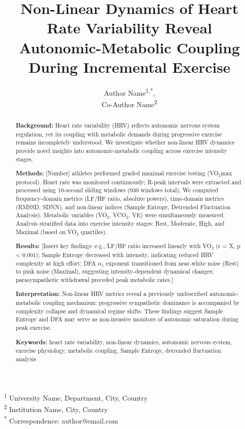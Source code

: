 \documentclass[12pt,a4paper]{article}
\title{\Large \textbf{Non-Linear Dynamics of Heart Rate Variability Reveal Autonomic-Metabolic Coupling During Incremental Exercise}}
\author{
    Author Name\textsuperscript{1,*}, \\
    Co-Author Name\textsuperscript{2}
}
\date{}
\makeatletter
\newcommand{\affiliation}{
    \small
    \textsuperscript{1} University Name, Department, City, Country \\
    \textsuperscript{2} Institution Name, City, Country \\
    \textsuperscript{*} Correspondence: author@email.com
}
\makeatother
\begin{document}
\maketitle

\affiliation

\vspace{1cm}


\begin{abstract}

\noindent
\textbf{Background:} Heart rate variability (HRV) reflects autonomic nervous system regulation, yet its coupling with metabolic demands during progressive exercise remains incompletely understood. We investigate whether non-linear HRV dynamics provide novel insights into autonomic-metabolic coupling across exercise intensity stages.

\noindent
\textbf{Methods:} [Number] athletes performed graded maximal exercise testing (VO$_2$max protocol). Heart rate was monitored continuously; R-peak intervals were extracted and processed using 10-second sliding windows (930 windows total). We computed frequency-domain metrics (LF/HF ratio, absolute powers), time-domain metrics (RMSSD, SDNN), and non-linear indices (Sample Entropy, Detrended Fluctuation Analysis). Metabolic variables (VO$_2$, VCO$_2$, VE) were simultaneously measured. Analysis stratified data into exercise intensity stages: Rest, Moderate, High, and Maximal (based on VO$_2$ quartiles).

\noindent
\textbf{Results:} [Insert key findings: e.g., LF/HF ratio increased linearly with VO$_2$ (r = X, p < 0.001); Sample Entropy decreased with intensity, indicating reduced HRV complexity at high effort; DFA $\alpha_1$ exponent transitioned from near-white noise (Rest) to pink noise (Maximal), suggesting intensity-dependent dynamical changes; parasympathetic withdrawal preceded peak metabolic rates.]

\noindent
\textbf{Interpretation:} Non-linear HRV metrics reveal a previously undescribed autonomic-metabolic coupling mechanism: progressive sympathetic dominance is accompanied by complexity collapse and dynamical regime shifts. These findings suggest Sample Entropy and DFA may serve as non-invasive monitors of autonomic saturation during peak exercise.

\noindent
\textbf{Keywords:} heart rate variability, non-linear dynamics, autonomic nervous system, exercise physiology, metabolic coupling, Sample Entropy, detrended fluctuation analysis

\end{abstract}
\end{document}
